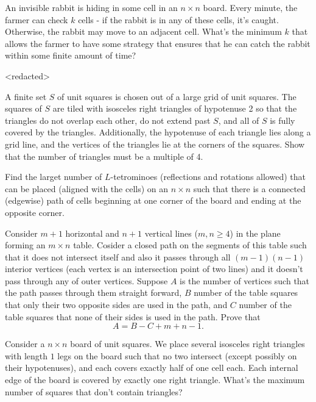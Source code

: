  {An invisible rabbit is hiding in some cell in an $n \times n$ board. Every minute, the farmer can check $k$ cells - if the rabbit is in any of these cells, it's caught. Otherwise, the rabbit may move to an adjacent cell. What's the minimum $k$ that allows the farmer to have some strategy that ensures that he can catch the rabbit within some finite amount of time?}



 {<redacted>}

 {A finite set $S$ of unit squares is chosen out of a large grid of unit squares. The squares of $S$ are tiled with isosceles right triangles of hypotenuse 2 so that the triangles do not overlap each other, do not extend past $S$, and all of $S$ is fully covered by the triangles. Additionally, the hypotenuse of each triangle lies along a grid line, and the vertices of the triangles lie at the corners of the squares. Show that the number of triangles must be a multiple of 4.}

 {Find the larget number of $L$-tetrominoes (reflections and rotations allowed) that can be placed (aligned with the cells) on an $n \times n$ such that there is a connected (edgewise) path of cells beginning at one corner of the board and ending at the opposite corner.}

 {Consider $m+1$ horizontal and $n+1$ vertical lines ($m,n\ge 4$) in the plane forming an $m\times n$ table. Cosider a closed path on the segments of this table such that it does not intersect itself and also it passes through all $(m-1)(n-1)$ interior vertices (each vertex is an intersection point of two lines) and it doesn't pass through any of outer vertices. Suppose $A$ is the number of vertices such that the path passes through them straight forward, $B$ number of the table squares that only their two opposite sides are used in the path, and $C$ number of the table squares that none of their sides is used in the path. Prove that
$$A=B-C+m+n-1.$$}

 {Consider a $n \times n$ board of unit squares. We place several isosceles right triangles with length $1$ legs on the board such that no two intersect (except possibly on their hypotenuses), and each covers exactly half of one cell each. Each internal edge of the board is covered by exactly one right triangle. What's the maximum number of squares that don't contain triangles?}



